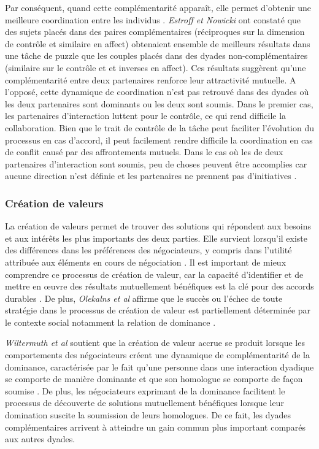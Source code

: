 	Par conséquent, quand cette complémentarité apparaît, elle permet d'obtenir une meilleure coordination entre les individus \cite{wiltermuth2015benefits}. \emph{Estroff et Nowicki} \cite{estroff1992interpersonal} ont constaté que des sujets placés dans des paires complémentaires (réciproques sur la dimension de contrôle et similaire en affect) obtenaient ensemble de meilleurs résultats dans une tâche de puzzle que les couples placés dans des dyades non-complémentaires (similaire sur le contrôle et et inverses en affect). Ces résultats suggèrent qu'une complémentarité entre deux partenaires renforce leur attractivité mutuelle.
	A l'opposé, cette dynamique de coordination n'est pas retrouvé dans des dyades où les deux partenaires sont dominants ou les deux sont soumis. 
	Dans le premier cas, les partenaires d'interaction luttent pour le contrôle, ce qui rend difficile la collaboration. Bien que le trait de contrôle de la tâche peut faciliter l'évolution du processus en cas d'accord, il peut facilement rendre difficile la coordination en cas de conflit causé par des affrontements mutuels. Dans le cas où les de deux partenaires d'interaction sont soumis, peu de choses peuvent être accomplies car aucune direction n'est définie et les partenaires ne prennent pas d'initiatives \cite{wiltermuth2015benefits}.
	 
	
		\subsubsection*{Création de valeurs}
		
	La création de valeurs permet de trouver des solutions qui répondent aux besoins et aux intérêts les plus importants des deux parties. Elle survient lorsqu'il existe des différences dans les préférences des négociateurs, y compris dans l'utilité attribuée  aux éléments en cours de négociation \cite{lax1986managerial}. 
	Il est important de mieux comprendre ce processus de création de valeur, car la capacité d'identifier et de mettre en œuvre des résultats mutuellement bénéfiques est la clé pour des accords durables \cite{wiltermuth2015benefits}.
	De plus, \emph{Olekalns et al} affirme que le succès ou l'échec de toute stratégie dans le processus de création de valeur est partiellement déterminée par le contexte social notamment la relation de dominance \cite{olekalns2013dyadic}.
	
	\emph{Wiltermuth et al} soutient que la création de valeur accrue se produit lorsque les comportements des négociateurs créent une dynamique de complémentarité de la dominance, caractérisée par le fait qu'une personne dans une interaction dyadique se comporte de manière dominante et que son homologue se comporte de façon soumise \cite{wiltermuth2015benefits}. De plus, les négociateurs exprimant de la dominance facilitent le processus de découverte de solutions mutuellement bénéfiques lorsque leur domination suscite la soumission de leurs homologues. De ce fait, les dyades complémentaires arrivent à atteindre un gain commun plus important comparés aux autres dyades.
	
